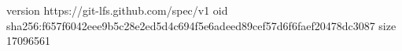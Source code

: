 version https://git-lfs.github.com/spec/v1
oid sha256:f657f6042eee9b5c28e2ed5d4c694f5e6adeed89cef57d6f6faef20478dc3087
size 17096561

